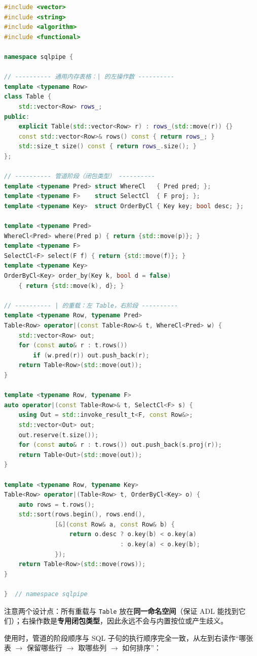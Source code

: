 \documentclass[12pt,a4paper,fontset=fandol]{ctexbook}
\newcommand{\Tp}[1]{\texttt{#1}}
\begin{document}
\begin{lstlisting}[language=C++]
#include <vector>
#include <string>
#include <algorithm>
#include <functional>

namespace sqlpipe {

// ---------- 通用内存表格：| 的左操作数 ----------
template <typename Row>
class Table {
    std::vector<Row> rows_;
public:
    explicit Table(std::vector<Row> r) : rows_(std::move(r)) {}
    const std::vector<Row>& rows() const { return rows_; }
    std::size_t size() const { return rows_.size(); }
};

// ---------- 管道阶段（闭包类型） ----------
template <typename Pred> struct WhereCl   { Pred pred; };
template <typename F>    struct SelectCl  { F proj; };
template <typename Key>  struct OrderByCl { Key key; bool desc; };

template <typename Pred>
WhereCl<Pred> where(Pred p) { return {std::move(p)}; }
template <typename F>
SelectCl<F> select(F f) { return {std::move(f)}; }
template <typename Key>
OrderByCl<Key> order_by(Key k, bool d = false)
    { return {std::move(k), d}; }

// ---------- | 的重载：左 Table，右阶段 ----------
template <typename Row, typename Pred>
Table<Row> operator|(const Table<Row>& t, WhereCl<Pred> w) {
    std::vector<Row> out;
    for (const auto& r : t.rows())
        if (w.pred(r)) out.push_back(r);
    return Table<Row>(std::move(out));
}

template <typename Row, typename F>
auto operator|(const Table<Row>& t, SelectCl<F> s) {
    using Out = std::invoke_result_t<F, const Row&>;
    std::vector<Out> out;
    out.reserve(t.size());
    for (const auto& r : t.rows()) out.push_back(s.proj(r));
    return Table<Out>(std::move(out));
}

template <typename Row, typename Key>
Table<Row> operator|(Table<Row> t, OrderByCl<Key> o) {
    auto rows = t.rows();
    std::sort(rows.begin(), rows.end(),
              [&](const Row& a, const Row& b) {
                  return o.desc ? o.key(b) < o.key(a)
                                : o.key(a) < o.key(b);
              });
    return Table<Row>(std::move(rows));
}

}  // namespace sqlpipe
\end{lstlisting}

注意两个设计点：所有重载与 \Tp{Table} 放在\textbf{同一命名空间}（保证 ADL 能找到它们）；右操作数是\textbf{专用闭包类型}，因此永远不会与内置按位或产生歧义。

使用时，管道的阶段顺序与 SQL 子句的执行顺序完全一致，从左到右读作``哪张表 $\to$ 保留哪些行 $\to$ 取哪些列 $\to$ 如何排序''：
\end{document}
